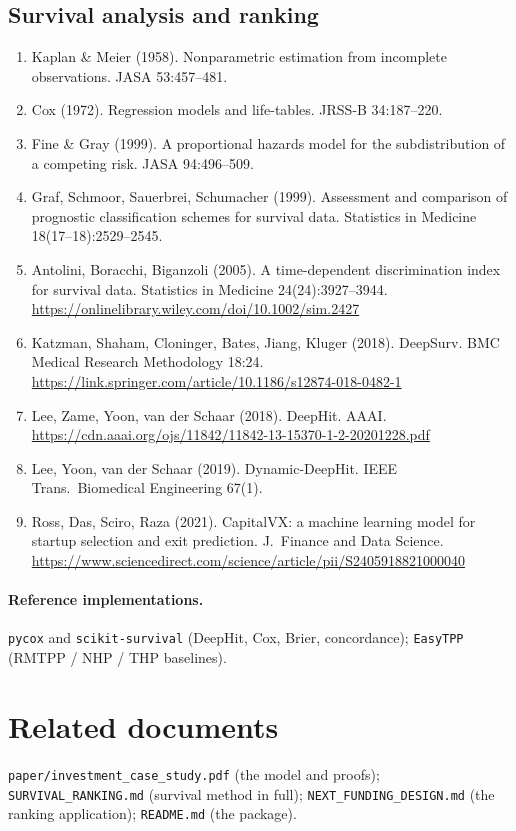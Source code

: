 \documentclass[11pt]{article}
\newcommand{\code}[1]{\texttt{#1}}
\begin{document}
\subsection*{Survival analysis and ranking}
\begin{enumerate}[leftmargin=1.6em,itemsep=2pt,start=16]
\item Kaplan \& Meier (1958). Nonparametric estimation from incomplete observations. JASA
53:457--481.
\item Cox (1972). Regression models and life-tables. JRSS-B 34:187--220.
\item Fine \& Gray (1999). A proportional hazards model for the subdistribution of a
competing risk. JASA 94:496--509.
\item Graf, Schmoor, Sauerbrei, Schumacher (1999). Assessment and comparison of prognostic
classification schemes for survival data. Statistics in Medicine 18(17--18):2529--2545.
\item Antolini, Boracchi, Biganzoli (2005). A time-dependent discrimination index for
survival data. Statistics in Medicine 24(24):3927--3944.
\url{https://onlinelibrary.wiley.com/doi/10.1002/sim.2427}
\item Katzman, Shaham, Cloninger, Bates, Jiang, Kluger (2018). DeepSurv. BMC Medical
Research Methodology 18:24. \url{https://link.springer.com/article/10.1186/s12874-018-0482-1}
\item Lee, Zame, Yoon, van der Schaar (2018). DeepHit. AAAI.
\url{https://cdn.aaai.org/ojs/11842/11842-13-15370-1-2-20201228.pdf}
\item Lee, Yoon, van der Schaar (2019). Dynamic-DeepHit. IEEE Trans.\ Biomedical
Engineering 67(1).
\item Ross, Das, Sciro, Raza (2021). CapitalVX: a machine learning model for startup
selection and exit prediction. J.\ Finance and Data Science.
\url{https://www.sciencedirect.com/science/article/pii/S2405918821000040}
\end{enumerate}

\paragraph{Reference implementations.} \code{pycox} and \code{scikit-survival} (DeepHit,
Cox, Brier, concordance); \code{EasyTPP} (RMTPP / NHP / THP baselines).

\section*{Related documents}
\code{paper/investment\_case\_study.pdf} (the model and proofs);
\code{SURVIVAL\_RANKING.md} (survival method in full);
\code{NEXT\_FUNDING\_DESIGN.md} (the ranking application);
\code{README.md} (the package).
\end{document}
